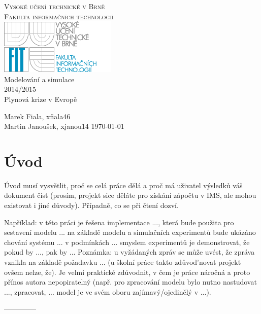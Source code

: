 \documentclass[a4paper,11pt]{article}
\begin{document}
\begin{center}
\Huge
\textsc{\LARGE Vysoké učení technické v Brně\\[-4.5mm] Fakulta informačních technologií}\\
\includegraphics{logo_fit.png}\\
{\LARGE Modelování a simulace\\[0mm]2014/2015}\\[2mm]
Plynová krize v Evropě\\
\end{center}
{\Large 
Marek Fiala, xfiala46\\
Martin Janoušek, xjanou14
\hfill
\today 
}

\thispagestyle{empty}
\newpage

\thispagestyle{empty}
\tableofcontents
\newpage


\section{Úvod} 

Úvod musí vysvětlit, proč se celá práce dělá a proč má uživatel výsledků váš dokument číst (prosím, projekt sice děláte pro získání zápočtu v IMS, ale mohou existovat i jiné důvody). Případně, co se při čtení dozví.

Například: 
v této práci je řešena implementace ..., která bude použita pro sestavení modelu ...
na základě modelu a simulačních experimentů bude ukázáno chování systému ... v podmínkách ...
smyslem experimentů je demonstrovat, že pokud by ..., pak by ...
Poznámka: u vyžádaných zpráv se může uvést, že zpráva vznikla na základě požadavku ... (u školní práce takto zdůvod'novat projekt ovšem nelze, že). Je velmi praktické zdůvodnit, v čem je práce náročná a proto přínos autora nepopiratelný (např. pro zpracování modelu bylo nutno nastudovat ..., zpracovat, ... model je ve svém oboru zajímavý/ojedinělý v ...).

--------------

\vline
\end{document}
